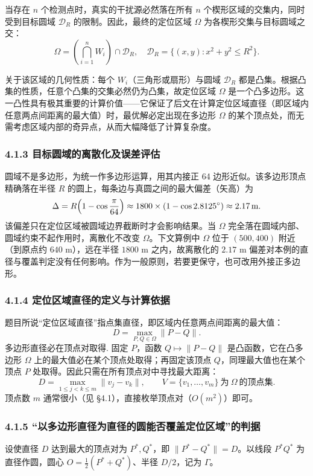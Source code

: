 \documentclass[UTF8, zihao=5,AutoFakeBold=2]{ctexart}
\begin{document}
当存在 \(n\) 个检测点时，真实的干扰源必然落在所有 \(n\) 个楔形区域的交集内，同时受到目标圆域 \(\mathcal{D}_R\) 的限制。因此，最终的定位区域 \(\Omega\) 为各楔形交集与目标圆域之交：
\[
\Omega = \left(\bigcap_{i=1}^{n} W_i\right) \cap \mathcal{D}_R, \quad \mathcal{D}_R = \{(x,y) : x^2 + y^2 \leq R^2\}.
\]

关于该区域的几何性质：每个 \(W_i\)（三角形或扇形）与圆域 \(\mathcal{D}_R\) 都是凸集。根据凸集的性质，任意个凸集的交集必然仍为凸集，故定位区域 \(\Omega\) 是一个凸多边形。这一凸性具有极其重要的计算价值——它保证了后文在计算定位区域直径（即区域内任意两点间距离的最大值）时，最优解必定出现在多边形 \(\Omega\) 的某个顶点处，而无需考虑区域内部的奇异点，从而大幅降低了计算复杂度。

\subsubsection*{4.1.3 \quad 目标圆域的离散化及误差评估}


圆域不是多边形，为统一作多边形运算，用其内接正 64 边形近似。该多边形顶点精确落在半径 \(R\) 的圆上，每条边与真圆之间的最大偏差（矢高）为\[\Delta = R\Bigl(1-\cos\frac{\pi}{64}\Bigr) \approx 1800 \times (1-\cos 2.8125^{\circ}) \approx 2.17\,\text{m}.
\]
该偏差只在定位区域被圆域边界截断时才会影响结果。当 \(\Omega\) 完全落在圆域内部、圆域约束不起作用时，离散化不改变 \(\Omega\)。下文算例中 \(\Omega\) 位于 \((500, 400)\) 附近（到原点约 \(640\) m），远在半径 \(1800\) m 之内，故离散化的 \(2.17\) m 偏差对本例的直径与覆盖判定没有任何影响。作为一般原则，若要更保守，也可改用外接正多边形。

	

	\subsubsection*{4.1.4 \quad 定位区域直径的定义与计算依据}
	题目所说“定位区域直径”指点集直径，即区域内任意两点间距离的最大值：
	\[
		D=\max_{P,Q\in\Omega}\lVert P-Q\rVert .
	\]
	多边形直径必在顶点对取得. 固定 \(P\)，函数 \(Q\mapsto\lVert P-Q\rVert\) 是凸函数，它在凸多边形 \(\Omega\) 上的最大值必在某个顶点处取得；再固定该顶点 \(Q\)，同理最大值也在某个顶点 \(P\) 处取得。因此只需在所有顶点对中寻找最大距离：
	\[
		D=\max_{1\le j<k\le m}\lVert v_j-v_k\rVert,\qquad
		V=\{v_1,\dots,v_m\}\ \text{为}\ \Omega\ \text{的顶点集}.
	\]
	顶点数 \(m\) 通常很小（见 \S4.1），直接枚举顶点对（\(O(m^2)\)）即可。

	\subsubsection*{4.1.5 \quad “以多边形直径为直径的圆能否覆盖定位区域”的判据}
	设使直径 \(D\) 达到最大的顶点对为 \(P^*,Q^*\)，即 \(\lVert P^*-Q^*\rVert=D\)。以线段 \(P^*Q^*\) 为直径作圆，圆心 \(O=\tfrac12(P^*+Q^*)\)、半径 \(D/2\)，记为 \(\Gamma\)。
\end{document}
